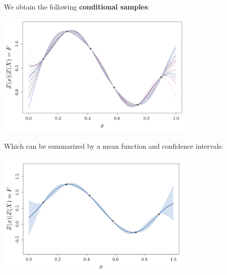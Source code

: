 \documentclass{beamer}
\begin{document}
\begin{frame}{}
We obtain the following \textbf{conditional samples}:
\begin{center}
\includegraphics[height=6cm]{figures/R/GPR_GaussPosterior}
\end{center}
\end{frame}

\begin{frame}{}
Which can be summarized by a mean function and confidence intervals:
\begin{center}
\includegraphics[height=6cm]{figures/R/GPR_GaussGPR}
\end{center}
\end{frame}
\end{document}
